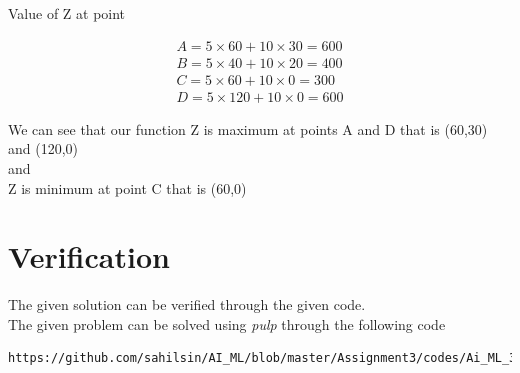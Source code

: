 Value of Z at point

\begin{align*}
     A= 5\times 60 + 10 \times 30 =600
\\
     B= 5\times 40 + 10 \times 20 =400
\\
     C= 5\times 60 + 10 \times 0 =300
\\
     D= 5\times 120 + 10 \times 0 =600
\end{align*}

We can see that our function Z is maximum at points A and D that is (60,30) and (120,0)\\
and\\
Z is minimum at point C that is (60,0)\\
%
\section{Verification}
The given solution can be verified through the given code.\\
The given problem can be solved using {\em pulp} through the following code
\begin{lstlisting}
https://github.com/sahilsin/AI_ML/blob/master/Assignment3/codes/Ai_ML_3.py
\end{lstlisting}
